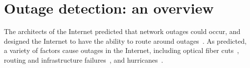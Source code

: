 




\section{Outage detection: an overview}

The architects of the Internet predicted that network outages could
occur, and designed the Internet to have the ability to route around
outages~\cite{clark-darpa}. As predicted, a variety of factors cause
outages in the Internet, including optical fiber
cuts~\cite{fiber-cuts}, routing and infrastructure
failures~\cite{backbone-failures-1999, ratulbgp}, and
hurricanes~\cite{pingin}.



